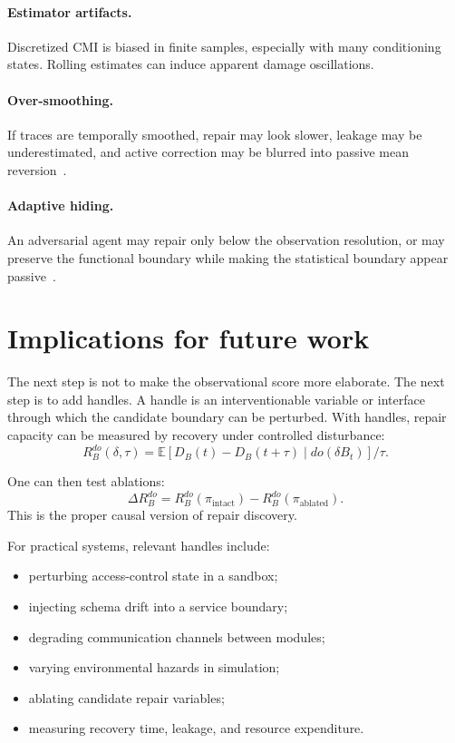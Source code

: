 \documentclass[11pt]{article}
\newcommand{\E}{\mathbb{E}}
\newcommand{\given}{\mid}
\begin{document}
\paragraph{Estimator artifacts.}
Discretized CMI is biased in finite samples, especially with many conditioning states. Rolling estimates can induce apparent damage oscillations.

\paragraph{Over-smoothing.}
If traces are temporally smoothed, repair may look slower, leakage may be underestimated, and active correction may be blurred into passive mean reversion~\cite{zarncke2026smoothing}.

\paragraph{Adaptive hiding.}
An adversarial agent may repair only below the observation resolution, or may preserve the functional boundary while making the statistical boundary appear passive~\cite{zarncke2026stealth}.

\section{Implications for future work}

The next step is not to make the observational score more elaborate. The next step is to add handles. A handle is an interventionable variable or interface through which the candidate boundary can be perturbed. With handles, repair capacity can be measured by recovery under controlled disturbance:
\begin{equation}
  R_B^{do}(\delta,\tau)
  =
  \E
  \left[
    D_B(t)-D_B(t+\tau)
    \given
    do(\delta B_t)
  \right]/\tau.
\end{equation}

One can then test ablations:
\begin{equation}
  \Delta R_B^{do}
  =
  R_B^{do}(\pi_{\mathrm{intact}})
  -
  R_B^{do}(\pi_{\mathrm{ablated}}).
\end{equation}
This is the proper causal version of repair discovery.

For practical systems, relevant handles include:
\begin{itemize}
  \item perturbing access-control state in a sandbox;
  \item injecting schema drift into a service boundary;
  \item degrading communication channels between modules;
  \item varying environmental hazards in simulation;
  \item ablating candidate repair variables;
  \item measuring recovery time, leakage, and resource expenditure.
\end{itemize}
\end{document}
